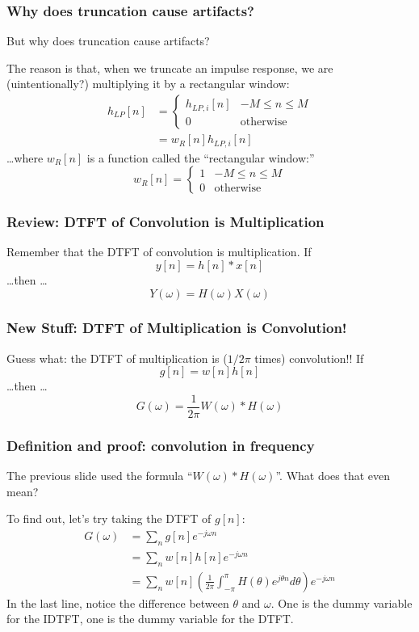 \documentclass{beamer}
\begin{document}
\begin{frame}
  \frametitle{Why does truncation cause artifacts?}

  But why does truncation cause artifacts?

  The reason is that, when we truncate an impulse response, we are
  (uintentionally?) multiplying it by a rectangular window:
  \begin{align*}
    h_{LP}[n] &= \begin{cases}
      h_{LP,i}[n] & -M\le n\le M\\
      0 &\mbox{otherwise}
    \end{cases}\\
    &= w_R[n] h_{LP,i}[n]
  \end{align*}
  \ldots where $w_R[n]$ is a function called the ``rectangular window:''
  \[
  w_R[n] = \begin{cases}
      1 & -M\le n\le M\\
      0 &\mbox{otherwise}
  \end{cases}
  \]
\end{frame}
    

\begin{frame}
  \frametitle{Review: DTFT of Convolution is Multiplication}

  Remember that the DTFT of convolution is multiplication.  If
  \[
  y[n] = h[n] \ast x[n]
  \]
  \ldots then \ldots
  \[
  Y(\omega) = H(\omega) X(\omega)
  \]
\end{frame}

\begin{frame}
  \frametitle{New Stuff: DTFT of Multiplication is Convolution!}

  Guess what: the DTFT of multiplication is ($1/2\pi$ times) convolution!!  If
  \[
  g[n] = w[n]h[n]
  \]
  \ldots then \ldots
  \[
  G(\omega) = \frac{1}{2\pi} W(\omega) \ast H(\omega)
  \]
  
\end{frame}

\begin{frame}
  \frametitle{Definition and proof: convolution in frequency}

  The previous slide used the formula ``$W(\omega)\ast H(\omega)$''.
  What does that even mean?

  To find out, let's try taking the DTFT of $g[n]$:
  \begin{align*}
    G(\omega) &= \sum_n g[n]e^{-j\omega n}\\
    &= \sum_n w[n]h[n] e^{-j\omega n}\\
    &= \sum_n w[n]\left(\frac{1}{2\pi}\int_{-\pi}^\pi H(\theta)e^{j\theta n}d\theta\right) e^{-j\omega n}
  \end{align*}
  In the last line, notice the difference between $\theta$ and
  $\omega$.  One is the dummy variable for the IDTFT, one is the dummy
  variable for the DTFT.
\end{frame}
\end{document}
